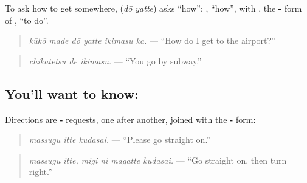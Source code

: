 To ask how to get somewhere, \textbf{} (\emph{dō yatte}) asks \textquotedblleft{}how\textquotedblright{}: \textbf{}, \textquotedblleft{}how\textquotedblright{}, with \textbf{}, the \textbf{-} form of \textbf{}, \textquotedblleft{}to do\textquotedblright{}.

\begin{quote}
\textbf{  }
\end{quote}

\begin{quote}
\emph{kūkō made dō yatte ikimasu ka.} — \textquotedblleft{}How do I get to the airport?\textquotedblright{}
\end{quote}

\begin{quote}
\textbf{ }
\end{quote}

\begin{quote}
\emph{chikatetsu de ikimasu.} — \textquotedblleft{}You go by subway.\textquotedblright{}
\end{quote}

\subsection*{You'll want to know:  }
Directions are \textbf{- } requests, one after another, joined with the \textbf{-} form:

\begin{quote}
\textbf{  }
\end{quote}

\begin{quote}
\emph{massugu itte kudasai.} — \textquotedblleft{}Please go straight on.\textquotedblright{}
\end{quote}

\begin{quote}
\textbf{   }
\end{quote}

\begin{quote}
\emph{massugu itte, migi ni magatte kudasai.} — \textquotedblleft{}Go straight on, then turn right.\textquotedblright{}
\end{quote}

\begin{quote}
\textbf{    }
\end{quote}

